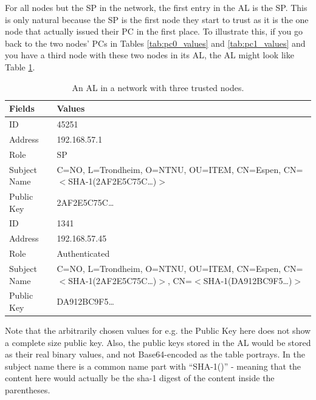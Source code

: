 For all nodes but the \ac{SP} in the network, the first entry in the \ac{AL} is
the \ac{SP}. This is only natural because the \ac{SP} is the first node they
start to trust as it is the one node that actually issued their \ac{PC} in the
first place. To illustrate this, if you go back to the two nodes' \acp{PC} in
Tables \ref{tab:pc0_values} and \ref{tab:pc1_values} and you have a third node
with these two nodes in its \ac{AL}, the \ac{AL} might look like Table
\ref{tab:al_content_3_nodes}.
\begin{table}[h]
	\centering
	\begin{tabularx}{\linewidth}{| l | X |}\hline
 		\textbf{Fields} & \textbf{Values}\\\hline
 		\hline
		ID & 45251\\\hline
		Address & 192.168.57.1\\\hline
		Role & SP\\\hline 
		Subject Name & C=NO, L=Trondheim, O=NTNU, OU=ITEM, CN=Espen, CN=$<$SHA-1(2AF2E5C75C\ldots)$>$\\\hline
		Public Key & 2AF2E5C75C\ldots\\\hline
		\hline
		ID & 1341\\\hline
		Address & 192.168.57.45\\\hline
		Role & Authenticated\\\hline 
		Subject Name & C=NO, L=Trondheim, O=NTNU, OU=ITEM, CN=Espen, CN=$<$SHA-1(2AF2E5C75C\ldots)$>$, CN=$<$SHA-1(DA912BC9F5\ldots)$>$\\\hline
		Public Key & DA912BC9F5\ldots\\\hline  
	\end{tabularx}
	\caption{An \acf{AL} in a network with three trusted nodes.}
	\label{tab:al_content_3_nodes}
\end{table}
Note that the arbitrarily chosen values for e.g. the Public Key here does not
show a complete size public key. Also, the public keys stored in the \ac{AL}
would be stored as their real binary values, and not Base64-encoded as the table
portrays. In the subject name there is a common name part with ``SHA-1()'' -
meaning that the content here would actually be the sha-1 digest of the content
inside the parentheses.

